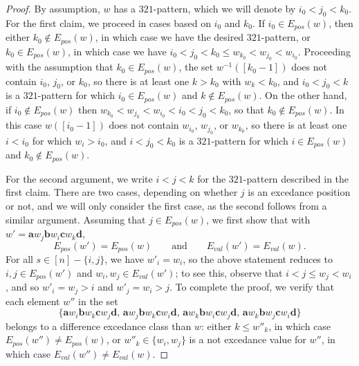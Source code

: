 \documentclass[12pt]{amsart}
\theoremstyle{definition}
\theoremstyle{remark}
\numberwithin{equation}{section}
\renewcommand{\setminus}{-}
\newcommand{\EP}{E_{pos}}
\newcommand{\EV}{E_{val}}
\begin{document}
\begin{proof}
By assumption, $w$ has a $321$-pattern, which we will denote by $i_{0} < j_{0} < k_{0}$.
For the first claim, we proceed in cases based on $i_{0}$ and $k_{0}$.  
If $i_{0} \in \EP(w)$, then either $k_{0} \notin \EP(w)$, in which case we have the desired $321$-pattern, or $k_{0} \in \EP(w)$, in which case we have $i_{0} < j_{0} < k_{0} \le w_{k_{0}} < w_{j_{0}} < w_{i_{0}}$.  
Proceeding with the assumption that $k_{0} \in \EP(w)$, the set $w^{-1}([k_{0}-1])$ does not contain $i_{0}$, $j_{0}$, or $k_{0}$, so there is at least one $k > k_{0}$ with $w_{k} < k_{0}$, and $i_{0} < j_{0} < k$ is a $321$-pattern for which $i_{0} \in \EP(w)$ and $k \notin\EP(w)$.  
On the other hand, if $i_{0} \notin \EP(w)$ then $w_{k_{0}} < w_{j_{0}} < w_{i_{0}} < i_{0} < j_{0} < k_{0}$, so that $k_{0} \notin \EP(w)$.  
In this case $w([i_{0} - 1])$ does not contain $w_{i_{0}}$, $w_{j_{0}}$, or $w_{k_{0}}$, so there is at least one $i < i_{0}$ for which $w_{i} > i_{0}$, and $i < j_{0} < k_{0}$ is a $321$-pattern for which $i \in \EP(w)$ and $k_{0} \notin\EP(w)$.  

For the second argument, we write $i < j < k$ for the $321$-pattern described in the first claim.  There are two cases, depending on whether $j$ is an excedance position or not, and we will only consider the first case, as the second follows from a similar argument.  Assuming that $j \in \EP(w)$, we first show that with $w' = \mathbf{a}w_{j}\mathbf{b}w_{i}\mathbf{c}w_{k}\mathbf{d}$, 
\[
\EP(w') = \EP(w)
\qquad\text{and}\qquad
\EV(w') = \EV(w).
\]
For all $s \in [n] \setminus \{i, j\}$, we have $w'_{i} = w_{i}$, so the above statement reduces to $i, j \in \EP(w')$ and $w_{i}, w_{j} \in \EV(w')$; to see this, observe that $i < j \le w_{j} < w_{i}$, and so $w'_{i} = w_{j} > i$ and $w'_{j} = w_{i} > j$.  
To complete the proof, we verify that each element $w''$ in the set
\[
\{
\mathbf{a}w_{i}\mathbf{b}w_{k}\mathbf{c}w_{j}\mathbf{d}, \,
\mathbf{a}w_{j}\mathbf{b}w_{k}\mathbf{c}w_{i}\mathbf{d}, \,
\mathbf{a}w_{k}\mathbf{b}w_{i}\mathbf{c}w_{j}\mathbf{d}, \,
\mathbf{a}w_{k}\mathbf{b}w_{j}\mathbf{c}w_{i}\mathbf{d}
\}
\]
belongs to a difference excedance class than $w$: either $k \le w''_{k}$, in which case $\EP(w'') \neq \EP(w)$, or $w''_{k} \in \{w_{i}, w_{j}\}$ is a not excedance value for $w''$, in which case $\EV(w'') \neq \EV(w)$.  
\end{proof}
\end{document}
